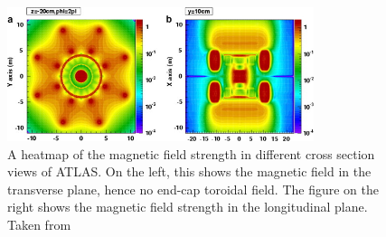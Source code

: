 \begin{figure}[pht]
    \centering
    \includegraphics[width=0.8\textwidth]{figures/atlas/atlas_magnetic_field.jpg}         
    \caption{A heatmap of the magnetic field strength in different cross section views of ATLAS\@. On the left, this shows the magnetic field in the transverse plane, hence no end-cap toroidal field. The figure on the right shows the magnetic field strength in the longitudinal plane. Taken from~\cite{atlas_magnetic_field_map}}\label{fig:atlas_magnetic_field_map}
\end{figure}
